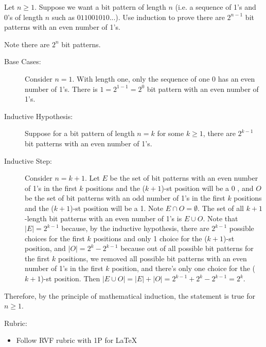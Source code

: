 \documentclass{article}
\theoremstyle{definition}
\begin{document}
\begin{question}
    Let $n\geq 1$. Suppose we want a bit pattern of length $n$ (i.e. a sequence of 1's and 0's of length $n$ such as $011001010...$). Use induction to prove there are $2^{n-1}$ bit patterns with an even number of 1's. 
\end{question}
\begin{solution}
        Note there are $2^n$ bit patterns. 
	\begin{description}
	\item[Base Cases: ] Consider $n=1$. With length one, only the sequence of one 0 has an even number of 1's. There is $1=2^{1-1} = 2^0$ bit pattern with an even number of 1's.
	
	\item[Inductive Hypothesis: ] Suppose for a bit pattern of length $n=k$ for some $k\geq 1$, there are $2^{k-1}$ bit patterns with an even number of 1's.
	
	\item[Inductive Step: ] Consider $n=k+1$. Let $E$ be the set of bit patterns with an even number of 1's in the first $k$ positions and the ($k+1$)-st position will be a 0 , and $O$ be the set of bit patterns with an odd number of 1's in the first $k$ positions and the ($k+1$)-st position will be a 1. Note $E\cap O=\emptyset$. The set of all $k+1$-length bit patterns with an even number of 1's is $E\cup O$. Note that $|E| = 2^{k-1}$ because, by the inductive hypothesis, there are $2^{k-1}$ possible choices for the first $k$ positions and only 1 choice for the ($k+1$)-st position, and $|O|=2^{k} -2^{k-1}$ because out of all possible bit patterns for the first $k$ positions, we removed all possible bit patterns with an even number of 1's in the first $k$ position, and there's only one choice for the ($k+1$)-st position. Then $|E\cup O| = |E| + |O| = 2^{k-1}+2^k-2^{k-1} = 2^k$. 
	\end{description}
	Therefore, by the principle of mathematical induction, the statement is true for $n\geq 1$.
	
{\color{red} Rubric:
\begin{itemize}
\item Follow RVF rubric with 1P for \LaTeX
\end{itemize}}
\end{solution}
\end{document}
